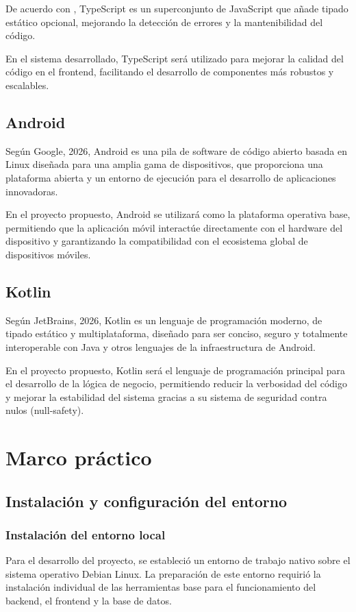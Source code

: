\documentclass[12pt,letterpaper]{report}
\begin{document}
	De acuerdo con \citet{typescript2023}, TypeScript es un superconjunto de JavaScript que añade tipado estático opcional, mejorando la detección de errores y la mantenibilidad del código.
	
	En el sistema desarrollado, TypeScript será utilizado para mejorar la calidad del código en el frontend, facilitando el desarrollo de componentes más robustos y escalables.
	
	\section{Android}
	Según Google, 2026, Android es una pila de software de código abierto basada en Linux diseñada para una amplia gama de dispositivos, que proporciona una plataforma abierta y un entorno de ejecución para el desarrollo de aplicaciones innovadoras.
	
	En el proyecto propuesto, Android se utilizará como la plataforma operativa base, permitiendo que la aplicación móvil interactúe directamente con el hardware del dispositivo y garantizando la compatibilidad con el ecosistema global de dispositivos móviles.
	
	\section{Kotlin}
	Según JetBrains, 2026, Kotlin es un lenguaje de programación moderno, de tipado estático y multiplataforma, diseñado para ser conciso, seguro y totalmente interoperable con Java y otros lenguajes de la infraestructura de Android.
	
	En el proyecto propuesto, Kotlin será el lenguaje de programación principal para el desarrollo de la lógica de negocio, permitiendo reducir la verbosidad del código y mejorar la estabilidad del sistema gracias a su sistema de seguridad contra nulos (null-safety).
	
	
	\chapter{Marco práctico} 
	
	\section{Instalación y configuración del entorno} 
	
	\subsection{Instalación del entorno local} 
	Para el desarrollo del proyecto, se estableció un entorno de trabajo nativo sobre el sistema operativo Debian Linux. La preparación de este entorno requirió la instalación individual de las herramientas base para el funcionamiento del backend, el frontend y la base de datos.
	
\end{document}
